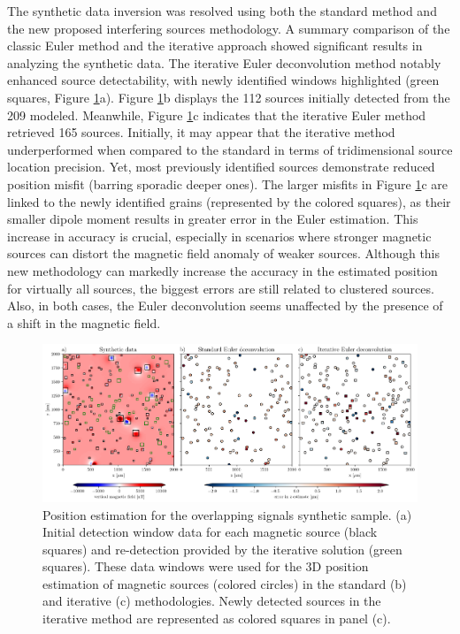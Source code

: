 The synthetic data inversion was resolved using both the standard method \citep{Souza-Junior2024} and the new proposed interfering sources methodology. A summary comparison of the classic Euler method and the iterative approach showed significant results in analyzing the synthetic data. The iterative Euler deconvolution method notably enhanced source detectability, with newly identified windows highlighted (green squares, Figure \ref{euler2}a). Figure \ref{euler2}b displays the 112 sources initially detected from the 209 modeled. Meanwhile, Figure \ref{euler2}c indicates that the iterative Euler method retrieved 165 sources. Initially, it may appear that the iterative method underperformed when compared to the standard in terms of tridimensional source location precision. Yet, most previously identified sources demonstrate reduced position misfit (barring sporadic deeper ones). The larger misfits in Figure \ref{euler2}c are linked to the newly identified grains (represented by the colored squares), as their smaller dipole moment results in greater error in the Euler estimation. This increase in accuracy is crucial, especially in scenarios where stronger magnetic sources can distort the magnetic field anomaly of weaker sources. Although this new methodology can markedly increase the accuracy in the estimated position for virtually all sources, the biggest errors are still related to clustered sources. Also, in both cases, the Euler deconvolution seems unaffected by the presence of a shift in the magnetic field.


\begin{figure}[tb!]
  \centering
  \includegraphics[width=1\linewidth]{paper/figures/euler-comparion-synthetic.png}
  \caption{
    Position estimation for the overlapping signals synthetic sample. (a) Initial detection window data for each magnetic source (black squares) and re-detection provided by the iterative solution (green squares). These data windows were used for the 3D position estimation of magnetic sources (colored circles) in the standard (b) and iterative (c) methodologies. Newly detected sources in the iterative method are represented as colored squares in panel (c).
  }
  \label{euler2}
\end{figure}

